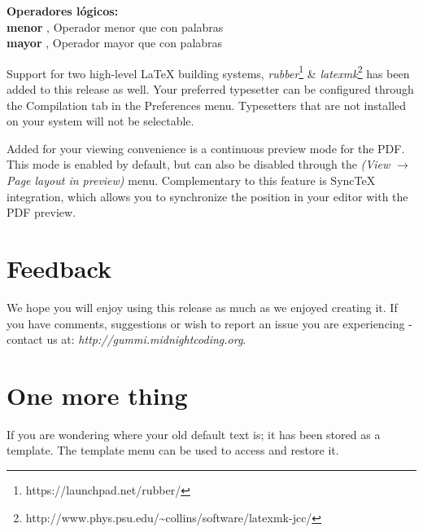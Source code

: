 \documentclass[11pt]{article}
\begin{document}
\large{\bf Operadores l\'ogicos:}\\

\large{\bf menor }, Operador menor que con palabras\\
\large{\bf mayor }, Operador mayor que con palabras\\

\newpage

Support for two high-level {\LaTeX} building systems, \emph{rubber}\footnote{https://launchpad.net/rubber/} \& \emph{latexmk}\footnote{http://www.phys.psu.edu/{\textasciitilde}collins/software/latexmk-jcc/} has been added to this release as well. Your preferred typesetter can be configured through the Compilation tab in the Preferences menu. Typesetters that are not installed on your system will not be selectable. 

Added for your viewing convenience is a continuous preview mode for the PDF. This mode is enabled by default, but can also be disabled through the \emph{(View $\rightarrow$ Page layout in preview)} menu. Complementary to this feature is SyncTeX integration, which allows you to synchronize the position in your editor with the PDF preview. 

\section{Feedback}
We hope you will enjoy using this release as much as we enjoyed creating it. If you have comments, suggestions or wish to report an issue you are experiencing - contact us at: \emph{http://gummi.midnightcoding.org}.

\section{One more thing}
If you are wondering where your old default text is; it has been stored as a template. The template menu can be used to access and restore it. 
\end{document}
